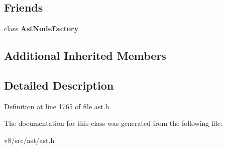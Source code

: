 \subsection*{Friends}
\begin{DoxyCompactItemize}
\item 
\mbox{\label{classv8_1_1internal_1_1ResolvedProperty_a8d587c8ad3515ff6433eb83c578e795f}} 
class {\bfseries Ast\+Node\+Factory}
\end{DoxyCompactItemize}
\subsection*{Additional Inherited Members}


\subsection{Detailed Description}


Definition at line 1765 of file ast.\+h.



The documentation for this class was generated from the following file\+:\begin{DoxyCompactItemize}
\item 
v8/src/ast/ast.\+h\end{DoxyCompactItemize}
